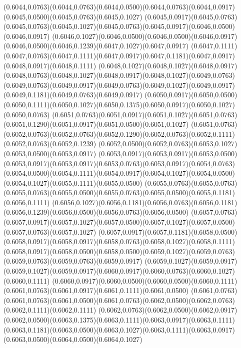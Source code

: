 (0.6044,0.0763)(0.6044,0.0763)(0.6044,0.0500)(0.6044,0.0763)(0.6044,0.0917)(0.6045,0.0500)(0.6045,0.0763)(0.6045,0.1027)
(0.6045,0.0917)(0.6045,0.0763)(0.6045,0.0763)(0.6045,0.1027)(0.6045,0.0763)(0.6045,0.0917)(0.6046,0.0500)(0.6046,0.0917)
(0.6046,0.1027)(0.6046,0.0500)(0.6046,0.0500)(0.6046,0.0917)(0.6046,0.0500)(0.6046,0.1239)(0.6047,0.1027)(0.6047,0.0917)
(0.6047,0.1111)(0.6047,0.0763)(0.6047,0.1111)(0.6047,0.0917)(0.6047,0.1181)(0.6047,0.0917)(0.6048,0.0917)(0.6048,0.1111)
(0.6048,0.1027)(0.6048,0.1027)(0.6048,0.0917)(0.6048,0.0763)(0.6048,0.1027)(0.6048,0.0917)(0.6048,0.1027)(0.6049,0.0763)
(0.6049,0.0763)(0.6049,0.0917)(0.6049,0.0763)(0.6049,0.1027)(0.6049,0.0917)(0.6049,0.1181)(0.6049,0.0763)(0.6049,0.0917)
(0.6050,0.0917)(0.6050,0.0500)(0.6050,0.1111)(0.6050,0.1027)(0.6050,0.1375)(0.6050,0.0917)(0.6050,0.1027)(0.6050,0.0763)
(0.6051,0.0763)(0.6051,0.0917)(0.6051,0.1027)(0.6051,0.0763)(0.6051,0.1290)(0.6051,0.0917)(0.6051,0.0500)(0.6051,0.1027)
(0.6051,0.0763)(0.6052,0.0763)(0.6052,0.0763)(0.6052,0.1290)(0.6052,0.0763)(0.6052,0.1111)(0.6052,0.0763)(0.6052,0.1239)
(0.6052,0.0500)(0.6052,0.0763)(0.6053,0.1027)(0.6053,0.0500)(0.6053,0.0917)
\PST@Solid(0.6053,0.0917)(0.6053,0.0917)(0.6053,0.0500)(0.6053,0.0917)(0.6053,0.0917)(0.6053,0.0763)(0.6053,0.0917)(0.6054,0.0763)
(0.6054,0.0500)(0.6054,0.1111)(0.6054,0.0917)(0.6054,0.1027)(0.6054,0.0500)(0.6054,0.1027)(0.6055,0.1111)(0.6055,0.0500)
(0.6055,0.0763)(0.6055,0.0763)(0.6055,0.0763)(0.6055,0.0500)(0.6055,0.0763)(0.6055,0.0500)(0.6055,0.1181)(0.6056,0.1111)
(0.6056,0.1027)(0.6056,0.1181)(0.6056,0.0763)(0.6056,0.1181)(0.6056,0.1239)(0.6056,0.0500)(0.6056,0.0763)(0.6056,0.0500)
(0.6057,0.0763)(0.6057,0.0917)(0.6057,0.1027)(0.6057,0.0500)(0.6057,0.1027)(0.6057,0.0500)(0.6057,0.0763)(0.6057,0.1027)
(0.6057,0.0917)(0.6057,0.1181)(0.6058,0.0500)(0.6058,0.0917)(0.6058,0.0917)(0.6058,0.0763)(0.6058,0.1027)(0.6058,0.1111)
(0.6058,0.0917)(0.6058,0.0500)(0.6058,0.0500)(0.6059,0.1027)(0.6059,0.0763)(0.6059,0.0763)(0.6059,0.0763)(0.6059,0.0917)
(0.6059,0.1027)(0.6059,0.0917)(0.6059,0.1027)(0.6059,0.0917)(0.6060,0.0917)(0.6060,0.0763)(0.6060,0.1027)(0.6060,0.1111)
(0.6060,0.0917)(0.6060,0.0500)(0.6060,0.0500)(0.6060,0.1111)(0.6061,0.0763)(0.6061,0.0917)(0.6061,0.1111)(0.6061,0.0500)
(0.6061,0.0763)(0.6061,0.0763)(0.6061,0.0500)(0.6061,0.0763)(0.6062,0.0500)(0.6062,0.0763)(0.6062,0.1111)(0.6062,0.1111)
(0.6062,0.0763)(0.6062,0.0500)(0.6062,0.0917)(0.6062,0.0500)(0.6063,0.1375)(0.6063,0.1111)(0.6063,0.0917)(0.6063,0.1111)
(0.6063,0.1181)(0.6063,0.0500)(0.6063,0.1027)(0.6063,0.1111)(0.6063,0.0917)(0.6063,0.0500)(0.6064,0.0500)(0.6064,0.1027)

